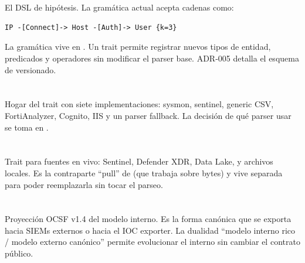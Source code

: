 \section{}

El DSL de hipótesis. La gramática actual acepta cadenas como:

\begin{lstlisting}[basicstyle=\ttfamily\small]
IP -[Connect]-> Host -[Auth]-> User {k=3}
\end{lstlisting}

La gramática vive en . Un trait
 permite registrar nuevos tipos de entidad,
predicados y operadores sin modificar el parser base. ADR-005
detalla el esquema de versionado.

\section{}

Hogar del trait  con siete implementaciones:
sysmon, sentinel, generic CSV, FortiAnalyzer, Cognito, IIS y un
parser fallback. La decisión de qué parser usar se toma en
.

\section{}

Trait  para fuentes en vivo: Sentinel, Defender
XDR, Data Lake, y archivos locales. Es la contraparte ``pull'' de
 (que trabaja sobre bytes) y vive
separada para poder reemplazarla sin tocar el parseo.

\section{}

Proyección OCSF v1.4 del modelo interno. Es la forma canónica que
se exporta hacia SIEMs externos o hacia el IOC exporter. La
dualidad ``modelo interno rico / modelo externo canónico''
permite evolucionar el interno sin cambiar el contrato público.

\section{}

